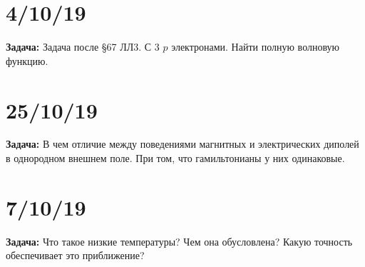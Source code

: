 \documentclass[a4paper, 14pt, russian]{article}
\begin{document}
	\section{4/10/19}

	\begin{tcolorbox}
		\textbf{Задача:} Задача после \S 67  ЛЛ3. С 3 $p$ электронами.
		Найти полную волновую функцию.
	\end{tcolorbox}

	\section{25/10/19}

	\begin{tcolorbox}
		\textbf{Задача:} В чем отличие между поведениями магнитных и электрических диполей 
		в однородном внешнем поле. При том, что гамильтонианы у них одинаковые.
	\end{tcolorbox}

	\section{7/10/19}
	\begin{tcolorbox}
		\textbf{Задача:} Что такое низкие температуры? Чем она обусловлена?
		Какую точность обеспечивает это приближение? 
	\end{tcolorbox}
\end{document}
